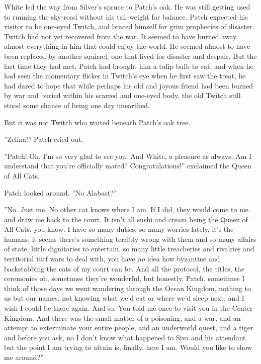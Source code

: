 \documentclass[12pt]{book}
\begin{document}
White led the way from Silver's spruce to Patch's oak. He was still getting used to running the sky-road without his tail-weight for balance. Patch expected his visitor to be one-eyed Twitch, and braced himself for grim prophecies of disaster. Twitch had not yet recovered from the war. It seemed to have burned away almost everything in him that could enjoy the world. He seemed almost to have been replaced by another squirrel, one that lived for disaster and despair. But the last time they had met, Patch had brought him a tulip bulb to eat; and when he had seen the momentary flicker in Twitch's eye when he first saw the treat, he had dared to hope that while perhaps his old and joyous friend had been burned by war and buried within his scarred and one-eyed body, the old Twitch still stood some chance of being one day unearthed.

But it was not Twitch who waited beneath Patch's oak tree.

''Zelina!'' Patch cried out.

''Patch! Oh, I'm so very glad to see you. And White, a pleasure as always. Am I understand that you're officially mated? Congratulations!'' exclaimed the Queen of All Cats.

Patch looked around. ''No Alabast?''

''No. Just me. No other cat knows where I am. If I did, they would come to me and draw me back to the court. It isn't all sushi and cream being the Queen of All Cats, you know. I have so many duties, so many worries %
lately, it's the humans, it seems there's something terribly wrong with them %
and so many affairs of state, little dignitaries to entertain, so many little treacheries and rivalries and territorial turf wars to deal with, you have {\it no} idea how byzantine and backstabbing the cats of my court can be. And all the protocol, the titles, the ceremonies %
oh, sometimes they're wonderful, but honestly, Patch, sometimes I think of those days we went wandering through the Ocean Kingdom, nothing to us but our names, not knowing what we'd eat or where we'd sleep next, and I wish I could be there again. And so. You told me once to visit you in the Center Kingdom. And there was the small matter of a poisoning, and a war, and an attempt to exterminate your entire people, and an underworld quest, and a tiger %
and before you ask, no I don't know what happened to Siva and his attendant %
but the point I am trying to attain is, finally, here I am. Would you like to show me around?''
\end{document}
